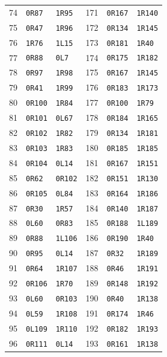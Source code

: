 \begin{longtable}{@{}rll@{\qquad}rll@{}}
74&\texttt{0R87}&\texttt{1R95}&171&\texttt{0R167}&\texttt{1R140}\\
75&\texttt{0R47}&\texttt{1R96}&172&\texttt{0R134}&\texttt{1R145}\\
76&\texttt{1R76}&\texttt{1L15}&173&\texttt{0R181}&\texttt{1R40}\\
77&\texttt{0R88}&\texttt{0L7}&174&\texttt{0R175}&\texttt{1R182}\\
78&\texttt{0R97}&\texttt{1R98}&175&\texttt{0R167}&\texttt{1R145}\\
79&\texttt{0R41}&\texttt{1R99}&176&\texttt{0R183}&\texttt{1R173}\\
80&\texttt{0R100}&\texttt{1R84}&177&\texttt{0R100}&\texttt{1R79}\\
81&\texttt{0R101}&\texttt{0L67}&178&\texttt{0R184}&\texttt{1R165}\\
82&\texttt{0R102}&\texttt{1R82}&179&\texttt{0R134}&\texttt{1R181}\\
83&\texttt{0R103}&\texttt{1R83}&180&\texttt{0R185}&\texttt{1R185}\\
84&\texttt{0R104}&\texttt{0L14}&181&\texttt{0R167}&\texttt{1R151}\\
85&\texttt{0R62}&\texttt{0R102}&182&\texttt{0R151}&\texttt{1R130}\\
86&\texttt{0R105}&\texttt{0L84}&183&\texttt{0R164}&\texttt{1R186}\\
87&\texttt{0R30}&\texttt{1R57}&184&\texttt{0R140}&\texttt{1R187}\\
88&\texttt{0L60}&\texttt{0R83}&185&\texttt{0R188}&\texttt{1L189}\\
89&\texttt{0R88}&\texttt{1L106}&186&\texttt{0R190}&\texttt{1R40}\\
90&\texttt{0R95}&\texttt{0L14}&187&\texttt{0R32}&\texttt{1R189}\\
91&\texttt{0R64}&\texttt{1R107}&188&\texttt{0R46}&\texttt{1R191}\\
92&\texttt{0R106}&\texttt{1R70}&189&\texttt{0R148}&\texttt{1R192}\\
93&\texttt{0L60}&\texttt{0R103}&190&\texttt{0R40}&\texttt{1R138}\\
94&\texttt{0L59}&\texttt{1R108}&191&\texttt{0R174}&\texttt{1R46}\\
95&\texttt{0L109}&\texttt{1R110}&192&\texttt{0R182}&\texttt{1R193}\\
96&\texttt{0R111}&\texttt{0L14}&193&\texttt{0R161}&\texttt{1R138}\\
\bottomrule
\end{longtable}
